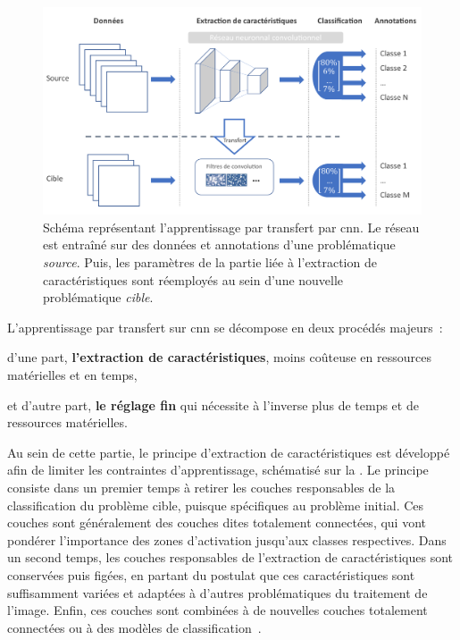 \begin{figure}[H]
    \centering
    \includegraphics[width=\linewidth]{contents/chapter_5/resources/scheme_transfer_learning.pdf}
    \caption{Schéma représentant l'apprentissage par transfert par \gls{cnn}. Le réseau est entraîné sur des données et annotations d'une problématique \textit{source}. Puis, les paramètres de la partie liée à l'extraction de caractéristiques sont réemployés au sein d'une nouvelle problématique \textit{cible}.}
    \label{fig:scheme_transfer_learning}
\end{figure}\par

L'apprentissage par transfert sur \gls{cnn} se décompose en deux procédés majeurs~:~
\begin{inlinerate}
    \item d'une part, \textbf{l'extraction de caractéristiques}, moins coûteuse en ressources matérielles et en temps,
    \item et d'autre part, \textbf{le réglage fin} qui nécessite à l'inverse plus de temps et de ressources matérielles. 
\end{inlinerate}
Au sein de cette partie, le principe d'extraction de caractéristiques est développé afin de limiter les contraintes d'apprentissage, schématisé sur la . Le principe consiste dans un premier temps à retirer les couches responsables de la classification du problème cible, puisque spécifiques au problème initial. Ces couches sont généralement des couches dites totalement connectées, qui vont pondérer l'importance des zones d'activation jusqu'aux classes respectives. Dans un second temps, les couches responsables de l'extraction de caractéristiques sont conservées puis figées, en partant du postulat que ces caractéristiques sont suffisamment variées et adaptées à d'autres problématiques du traitement de l'image. Enfin, ces couches sont combinées à de nouvelles couches totalement connectées ou à des modèles de classification~\cite{Litjens2017}.\par 

